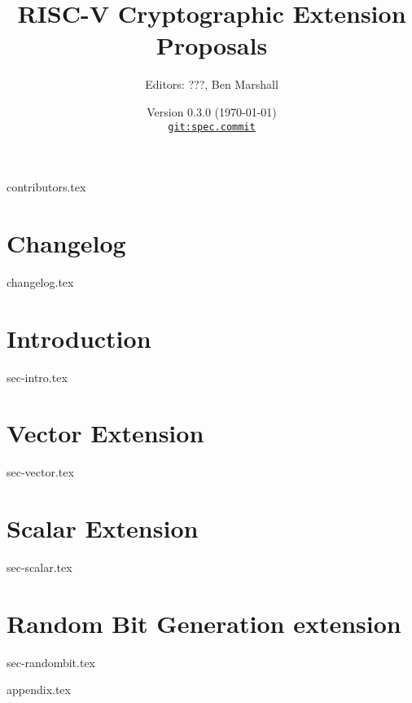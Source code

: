 \documentclass[11pt]{article}
\title{RISC-V Cryptographic Extension Proposals}
\author{Editors: ???, Ben Marshall}
\date{Version $0.3.0$ (\today) \\
\href{https://github.com/scarv/riscv-crypto}{
{\small \tt git:{spec.commit}}}
}
\begin{document}

\maketitle

{contributors.tex}

\tableofcontents


\newpage
\section{Changelog}
\label{sec:changelog}
{changelog.tex}


\newpage
\section{Introduction}
\label{sec:intro}
{sec-intro.tex}

\newpage
\section{Vector Extension}
\label{sec:vector}
{sec-vector.tex}

\newpage
\section{Scalar Extension}
\label{sec:scalar}
{sec-scalar.tex}

\newpage
\section{Random Bit Generation extension}
\label{sec:randombit}
{sec-randombit.tex}


\newpage
\printbibliography


%
%

\newpage
\begin{appendices}
\label{sec:appendix}
{appendix.tex}
\end{appendices}

\end{document}
